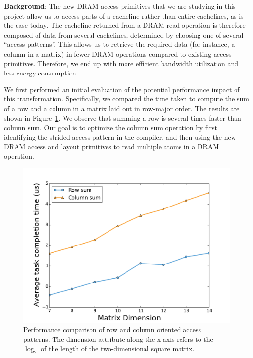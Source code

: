 \documentclass[letterpaper]{article}
\begin{document}
\textbf{Background}: The new DRAM access primitives that we are studying in
this project allow us to access parts of a cacheline rather than entire cachelines,
as is the case today. The cacheline returned from a DRAM read operation is
therefore composed of data from several cachelines, determined by choosing one
of several ``access patterns''.
This allows us to retrieve the required data (for instance, a column in a matrix) in fewer DRAM operations
compared to existing access primitives. Therefore, we end up with more efficient bandwidth
utilization and less energy consumption.

We first performed an initial evaluation of the potential performance impact of this transformation.
Specifically, we compared the time taken to compute the sum of a row and a column in a matrix laid out in
row-major order. The results are shown in Figure~\ref{fig:perf}. We observe that summing a row is several times faster than column sum.
Our goal is to optimize the column sum operation by first identifying the
strided access pattern in the compiler, and then using the new DRAM access and
layout primitives to read multiple atoms in a DRAM operation.

\begin{figure}[ht]
	\centering
	\includegraphics[scale=0.35]{images/rowmajor}
	\caption{Performance comparison of row and column oriented access patterns.
	The dimension attribute along the x-axis refers to the $\log_2$ of the length of the two-dimensional square matrix. }
	\label{fig:perf}
\end{figure}
\end{document}
